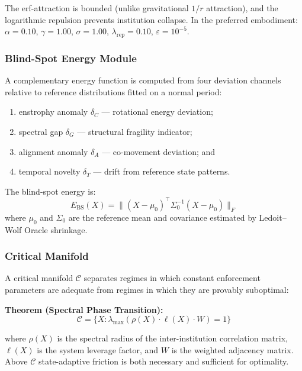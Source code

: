 \documentclass[12pt,a4paper]{article}
\begin{document}
The erf-attraction is bounded (unlike gravitational $1/r$ attraction),
and the logarithmic repulsion prevents institution collapse. In the preferred
embodiment: $\alpha{=}0.10$, $\gamma{=}1.00$, $\sigma{=}1.00$,
$\lambda_{\mathrm{rep}}{=}0.10$, $\varepsilon{=}10^{-5}$.

\subsubsection{Blind-Spot Energy Module}

A complementary energy function is computed from four deviation channels
relative to reference distributions fitted on a normal period:
\begin{enumerate}[label=(\alph*)]
\item enstrophy anomaly $\delta_C$ --- rotational energy deviation;
\item spectral gap $\delta_G$ --- structural fragility indicator;
\item alignment anomaly $\delta_A$ --- co-movement deviation; and
\item temporal novelty $\delta_T$ --- drift from reference state patterns.
\end{enumerate}

The blind-spot energy is:
\begin{equation}
E_{\mathrm{BS}}(X) =
\|(X-\mu_0)^\top\Sigma_0^{-1}(X-\mu_0)\|_F
\end{equation}
where $\mu_0$ and $\Sigma_0$ are the reference mean and covariance estimated
by Ledoit--Wolf Oracle shrinkage.

\subsubsection{Critical Manifold}

A critical manifold $\mathcal{C}$ separates regimes in which constant
enforcement parameters are adequate from regimes in which they are provably
suboptimal:

\textbf{Theorem (Spectral Phase Transition):}
\begin{equation}
\mathcal{C} = \{X : \lambda_{\max}(\rho(X)\cdot\ell(X)\cdot W) = 1\}
\end{equation}

where $\rho(X)$ is the spectral radius of the inter-institution correlation
matrix, $\ell(X)$ is the system leverage factor, and $W$ is the weighted
adjacency matrix. Above $\mathcal{C}$ state-adaptive friction is both
necessary and sufficient for optimality.
\end{document}
